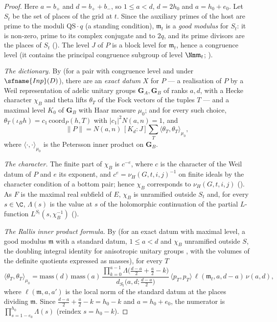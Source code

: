 \begin{proof}
Here $a=b_+$ and $d=b_++b_-$, so $1\le a<d$, $d=2h_0$ and $a=h_0+e_0$. Let $S_t$ be the set of places of the grid at $t$.
Since the auxiliary primes of the host are prime to the moduli $\mathrm{QS}\cdot q$ (a standing condition), $\mathfrak m_t$ is a
\emph{good modulus} for $S_t$: it is non-zero, prime to its complex conjugate and to $2q$, and its prime divisors are the places
of $S_t$ (). The level $J$ of $P$ is a block level for $\mathfrak m_t$, hence a
congruence level (it contains the principal congruence subgroup of level $\Nm\mathfrak m_t$;
).

\emph{The dictionary.} By  (for a pair with congruence level and under
$\sfname{Inp}(D)$), there are an \emph{exact datum} $X$ for $P$ --- a realisation of $P$ by a Weil representation of adelic
unitary groups $\mathbf G_A,\mathbf G_B$ of ranks $a,d$, with a Hecke character $\chi_B$ and theta lifts $\theta_T$ of the
Fock vectors of the tuples $T$ --- and a maximal level $K_0$ of $\mathbf G_B$ with Haar measure $\mu_0$; and for every such
choice, $\theta_T(\iota_Bh)=c_1\,\mathrm{coord}_P(h,T)$ with $|c_1|^2N(a,n)=1$, and
\begin{equation}\label{eq:pf:fit:dict}
\|P\|=N(a,n)\,[K_d:J]\sum_T\langle\theta_T,\theta_T\rangle_{\mu_0},
\end{equation}
where $\langle\cdot,\cdot\rangle_{\mu_0}$ is the Petersson inner product on $\mathbf G_B$.

\emph{The character.} The finite part of $\chi_B$ is $c^{-e}$, where $c$ is the character of the Weil datum of $P$ and $e$
its exponent, and $c^{e}=\nu_H(G,t,i,j)^{-1}$ on finite ideals by the character condition of a bottom pair; hence $\chi_B$
corresponds to $\nu_H(G,t,i,j)$
(). As $F$ is the maximal real subfield of $E$, $\chi_B$ is
unramified outside $S_t$ and, for every $s\in\C$, $\Lambda(s)$ is the value at $s$ of the holomorphic continuation of the
partial $L$-function $L^{S_t}(s,\chi_B^{-1})$ ().

\emph{The Rallis inner product formula.} By 
(for an exact datum with maximal level, a good modulus $\mathfrak m$ with a standard datum, $1\le a<d$ and $\chi_B$ unramified
outside $S$, the doubling integral identity for anisotropic unitary groups \cite{Rallis1984}, with the volumes of the
definite quotients expressed as masses), for every $T$
\[
\langle\theta_T,\theta_T\rangle_{\mu_0}=\mathrm{mass}(d)\,\mathrm{mass}(a)\,
\frac{\prod_{k=0}^{a-1}\Lambda\bigl(\tfrac{d-a}2+\tfrac a2-k\bigr)}{d_{S_t}\bigl(a,d;\tfrac{d-a}2\bigr)}\,
\langle p_T,p_T\rangle\,\ell(\mathfrak m_t,a,d-a)\,\nu(a,d),
\]
where $\ell(\mathfrak m,a,a')$ is the local norm of the standard datum at the places dividing $\mathfrak m$. Since
$\tfrac{d-a}2+\tfrac a2-k=h_0-k$ and $a=h_0+e_0$, the numerator is $\prod_{s=1-e_0}^{h_0}\Lambda(s)$ (reindex $s=h_0-k$).


\end{proof}
